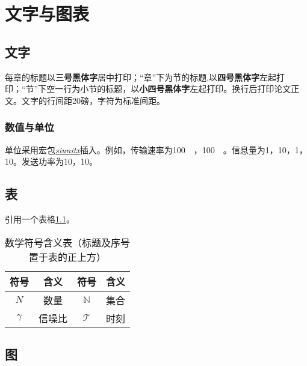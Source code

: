 \chapter{文字与图表}
\section{文字}
每章的标题以\textbf{三号黑体字}居中打印；“章”下为节的标题,以\textbf{四号黑体字}左起打印；“节”下空一行为小节的标题，以\textbf{小四号黑体字}左起打印。换行后打印论文正文。文字的行间距20磅，字符为标准间距。

\subsection{数值与单位}

单位采用宏包\href{http://mirrors.sjtug.sjtu.edu.cn/ctan/macros/latex/contrib/siunitx/siunitx.pdf}{\textit{siunitx}}插入。例如，传输速率为\SI[per-mode = symbol, per-symbol = p]{100}{\mega\bps}，\SI[per-mode = symbol, per-symbol = p]{100}{\mega\Bps}。信息量为\SI{1}{\bit}，\SI{10}{\bits}，\SI{1}{\bytefull}，\SI{10}{\bytes}。发送功率为\SI{10}{\dBm}，\SI{10}{\dBW}。

\section{表}

引用一个表格\ref{chap:notation}。

\begin{table}[!ht]
	\centering
	\caption{数学符号含义表（标题及序号置于表的正上方）}
	\label{chap:notation}
	\begin{tabular}{|c|c||c|c|}
		\hline
		\rowcolor{LightSteelBlue}
		\textbf{符号} 			& \textbf{含义} 	    & \textbf{符号}		  & \textbf{含义} 		   	 \\
		\hline
		$N$ 					 & 数量		   		 & $\mathbb{N}$ 		 & 集合 						\\
		\hline
		$\gamma$ 				 & 信噪比			    & $\mathcal{T}$ 		& 时刻		 			   \\
		\hline
	\end{tabular}
\end{table}

\section{图}


